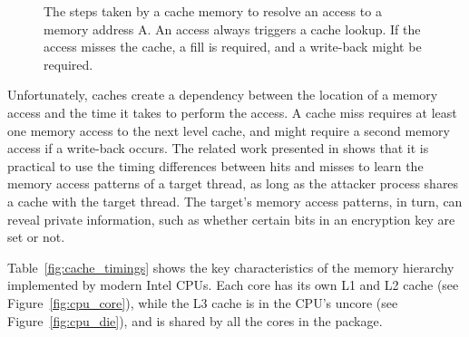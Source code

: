 \begin{figure}[hbt]
  \caption{
    The steps taken by a cache memory to resolve an access to a memory address
    A. An access always triggers a cache lookup. If the access misses the
    cache, a fill is required, and a write-back might be required.
  }
  \label{fig:cache_lookup}
\end{figure}

Unfortunately, caches create a dependency between the location of a memory
access and the time it takes to perform the access. A cache miss requires
at least one memory access to the next level cache, and might require a second
memory access if a write-back occurs. The related work presented in
\cite{banescu2011cache} shows that it is practical to use the timing
differences between hits and misses to learn the memory access patterns of a
target thread, as long as the attacker process shares a cache with the target
thread. The target's memory access patterns, in turn, can reveal private
information, such as whether certain bits in an encryption key are set or not.

Table~\ref{fig:cache_timings} shows the key characteristics of the memory
hierarchy implemented by modern Intel CPUs. Each core has its own L1 and L2
cache (see Figure~\ref{fig:cpu_core}), while the L3 cache is in the CPU's
uncore (see Figure~\ref{fig:cpu_die}), and is shared by all the cores in the
package.

